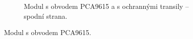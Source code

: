 \begin{figure}[H]
\begin{subfigure}{.5\textwidth}
    \caption{Modul s obvodem PCA9615 a s ochrannými transily – spodní strana.}
    \label{fig:modul-pca9615-transily}
\end{subfigure}
\caption{Modul s obvodem PCA9615.}
\label{fig:modul-pca9615}
\end{figure}
